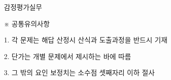 감정평가실무 \par
※ 공통유의사항 \par
1. 각 문제는 해답 산정시 산식과 도출과정을 반드시 기재 \par
2. 단가는 개별 문제에서 제시하는 바에 따름 \par
3. 그 밖의 요인 보정치는 소수점 셋째자리 이하 절사 \par
